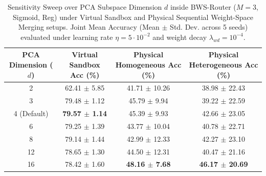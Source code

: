 \begin{table}[t]
\caption{Sensitivity Sweep over PCA Subspace Dimension $d$ inside BWS-Router ($M=3$, Sigmoid, Reg) under Virtual Sandbox and Physical Sequential Weight-Space Merging setups. Joint Mean Accuracy (Mean $\pm$ Std. Dev. across 5 seeds) evaluated under learning rate $\eta = 5 \cdot 10^{-2}$ and weight decay $\lambda_{wd} = 10^{-4}$.}
\label{tab:pca_dim_sweep}
\vskip 0.15in
\begin{center}
\begin{small}
\begin{tabular}{cccc}
\toprule
\textbf{PCA Dimension ($d$)} & \textbf{Virtual Sandbox Acc (\%)} & \textbf{Physical Homogeneous Acc (\%)} & \textbf{Physical Heterogeneous Acc (\%)} \\
\midrule
2   & 62.41 $\pm$ 5.85 & 41.71 $\pm$ 10.26 & 38.98 $\pm$ 22.43 \\
3   & 79.48 $\pm$ 1.12 & 45.79 $\pm$ 9.94  & 39.22 $\pm$ 22.59 \\
4 (Default) & \textbf{79.57 $\pm$ 1.14} & 45.39 $\pm$ 9.93 & 42.66 $\pm$ 23.05 \\
6   & 79.25 $\pm$ 1.39 & 43.77 $\pm$ 10.04 & 40.78 $\pm$ 22.71 \\
8   & 79.14 $\pm$ 1.44 & 42.99 $\pm$ 12.33 & 42.27 $\pm$ 23.10 \\
12  & 78.65 $\pm$ 1.30 & 44.50 $\pm$ 12.31 & 40.47 $\pm$ 21.16 \\
16  & 78.42 $\pm$ 1.60 & \textbf{48.16 $\pm$ 7.68} & \textbf{46.17 $\pm$ 20.69} \\
\bottomrule
\end{tabular}
\end{small}
\end{center}
\vskip -0.1in
\end{table}

